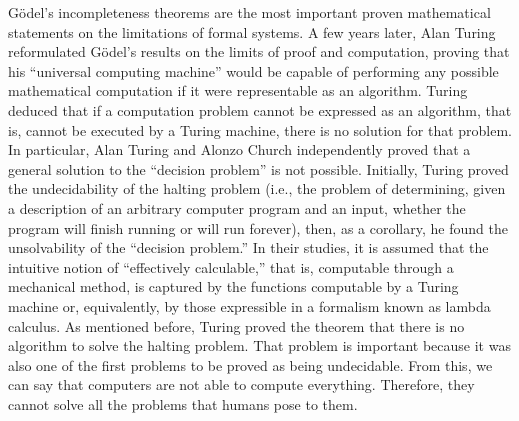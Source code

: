 G\"{o}del's incompleteness theorems are the most important proven mathematical statements on the limitations of formal systems. A few years later, Alan Turing reformulated G\"{o}del's results on the limits of proof and computation, proving that his ``universal computing machine'' would be capable of performing any possible mathematical computation if it were representable as an algorithm. Turing deduced that if a computation problem cannot be expressed as an algorithm, that is, cannot be executed by a Turing machine, there is no solution for that problem. In particular, Alan Turing and Alonzo Church independently proved that a general solution to the ``decision problem'' is not possible. Initially, Turing proved the undecidability of the halting problem (i.e., the problem of determining, given a description of an arbitrary computer program and an input, whether the program will finish running or will run forever), then, as a corollary, he found the unsolvability of the ``decision problem.'' In their studies, it is assumed that the intuitive notion of ``effectively calculable,'' that is, computable through a mechanical method, is captured by the functions computable by a Turing machine or, equivalently, by those expressible in a formalism known as lambda calculus. As mentioned before, Turing proved the theorem that there is no algorithm to solve the halting problem. That problem is important because it was also one of the first problems to be proved as being undecidable. From this, we can say that computers are not able to compute everything. Therefore, they cannot solve all the problems that humans pose to them.

